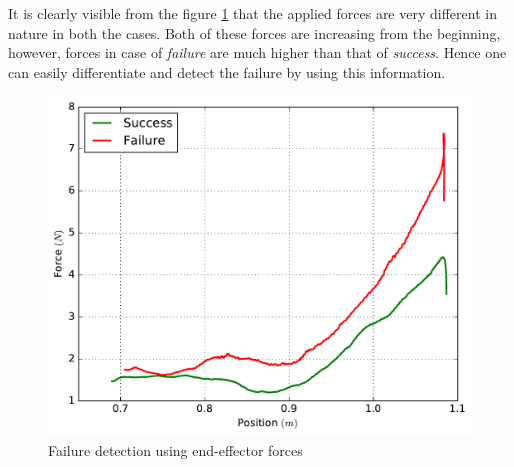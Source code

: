 \documentclass[sigconf]{acmart}
\begin{document}
It is clearly visible from the figure \ref{fig:position_force} that the applied forces are very different in nature in both the cases. Both of these forces are increasing from the beginning, however, forces in case of \textit{failure} are much higher than that of \textit{success}. Hence one can easily differentiate and detect the failure by using this information.

\begin{figure}
	\includegraphics[width=.9\linewidth]{position_force}
	\caption{Failure detection using end-effector forces}
	\label{fig:position_force}
\end{figure}
\end{document}
